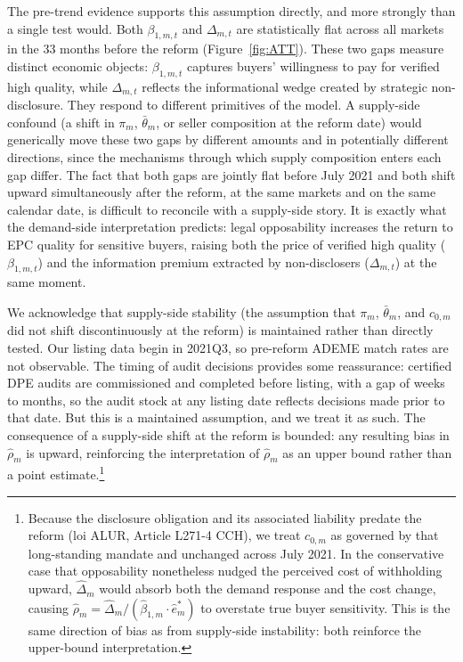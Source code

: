 \documentclass[10pt,letterpaper]{bp-template-concise}
\begin{document}
The pre-trend evidence supports this assumption directly, and more strongly than a single test would. Both $\beta_{1,m,t}$ and $\Delta_{m,t}$ are statistically flat across all markets in the 33 months before the reform (Figure~\ref{fig:ATT}). These two gaps measure distinct economic objects: $\beta_{1,m,t}$ captures buyers' willingness to pay for verified high quality, while $\Delta_{m,t}$ reflects the informational wedge created by strategic non-disclosure. They respond to different primitives of the model. A supply-side confound (a shift in $\pi_m$, $\bar\theta_m$, or seller composition at the reform date) would generically move these two gaps by different amounts and in potentially different directions, since the mechanisms through which supply composition enters each gap differ. The fact that both gaps are jointly flat before July 2021 and both shift upward simultaneously after the reform, at the same markets and on the same calendar date, is difficult to reconcile with a supply-side story. It is exactly what the demand-side interpretation predicts: legal opposability increases the return to EPC quality for sensitive buyers, raising both the price of verified high quality ($\beta_{1,m,t}$) and the information premium extracted by non-disclosers ($\Delta_{m,t}$) at the same moment.

We acknowledge that supply-side stability (the assumption that $\pi_m$, $\bar\theta_m$, and $c_{0,m}$ did not shift discontinuously at the reform) is maintained rather than directly tested. Our listing data begin in 2021Q3, so pre-reform ADEME match rates are not observable. The timing of audit decisions provides some reassurance: certified DPE audits are commissioned and completed before listing, with a gap of weeks to months, so the audit stock at any listing date reflects decisions made prior to that date. But this is a maintained assumption, and we treat it as such. The consequence of a supply-side shift at the reform is bounded: any resulting bias in $\hat\rho_m$ is upward, reinforcing the interpretation of $\hat\rho_m$ as an upper bound rather than a point estimate.\footnote{Because the disclosure obligation and its associated liability predate the reform (loi ALUR, Article L271-4 CCH), we treat $c_{0,m}$ as governed by that long-standing mandate and unchanged across July 2021. In the conservative case that opposability nonetheless nudged the perceived cost of withholding upward, $\hat\Delta_m$ would absorb both the demand response and the cost change, causing $\hat\rho_m = \hat\Delta_m / (\hat\beta_{1,m}\cdot\hat{e}^*_m)$ to overstate true buyer sensitivity. This is the same direction of bias as from supply-side instability: both reinforce the upper-bound interpretation.}
\end{document}
